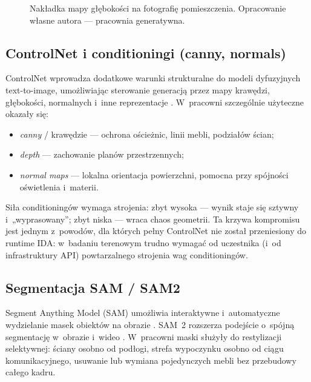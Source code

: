 \begin{figure}[htbp]
  \centering
  \caption{Nakładka mapy głębokości na fotografię pomieszczenia.
  Opracowanie własne autora --- pracownia generatywna.}
  \label{fig:ch04:depth}
\end{figure}

\subsection{ControlNet i conditioningi (canny, normals)}
\label{ch04:sec:controlnet}

ControlNet wprowadza dodatkowe warunki strukturalne do modeli dyfuzyjnych text-to-image, umożliwiając sterowanie generacją przez mapy krawędzi, głębokości, normalnych i~inne reprezentacje \parencite{zhang2023controlnet}. W~pracowni szczególnie użyteczne okazały się:
\begin{itemize}
  \item \emph{canny} / krawędzie --- ochrona ościeżnic, linii mebli, podziałów ścian;
  \item \emph{depth} --- zachowanie planów przestrzennych;
  \item \emph{normal maps} --- lokalna orientacja powierzchni, pomocna przy spójności oświetlenia i~materii.
\end{itemize}
Siła conditioningów wymaga strojenia: zbyt wysoka --- wynik staje się sztywny i~„wyprasowany”; zbyt niska --- wraca chaos geometrii. Ta krzywa kompromisu jest jednym z~powodów, dla których pełny ControlNet nie został przeniesiony do runtime IDA: w~badaniu terenowym trudno wymagać od uczestnika (i~od infrastruktury API) powtarzalnego strojenia wag conditioningów.

\subsection{Segmentacja SAM / SAM2}
\label{ch04:sec:sam}

Segment Anything Model (SAM) umożliwia interaktywne i~automatyczne wydzielanie masek obiektów na obrazie \parencite{kirillov2023sam}. SAM~2 rozszerza podejście o~spójną segmentację w~obrazie i~wideo \parencite{ravi2024sam2}. W~pracowni maski służyły do restylizacji selektywnej: ściany osobno od podłogi, strefa wypoczynku osobno od ciągu komunikacyjnego, usuwanie lub wymiana pojedynczych mebli bez przebudowy całego kadru.

